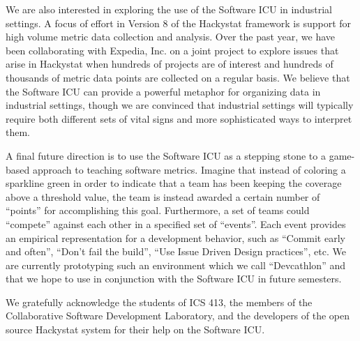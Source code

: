 \documentclass[times,10pt,twocolumn]{article}
\begin{document}
We are also interested in exploring the use of the Software ICU in
industrial settings.  A focus of effort in Version 8 of the Hackystat
framework is support for high volume metric data collection and
analysis.  Over the past year, we have been collaborating with Expedia,
Inc. on a joint project to explore issues that arise in Hackystat when
hundreds of projects are of interest and hundreds of thousands of metric
data points are collected on a regular basis.  We believe that the Software
ICU can provide a powerful metaphor for organizing data in industrial
settings, though we are convinced that industrial settings will typically
require both different sets of vital signs and more sophisticated ways to
interpret them.

A final future direction is to use the Software ICU as a stepping stone to
a game-based approach to teaching software metrics.  Imagine that instead
of coloring a sparkline green in order to indicate that a team has been
keeping the coverage above a threshold value, the team is instead awarded
a certain number of ``points'' for accomplishing this goal.  Furthermore,
a set of teams could ``compete'' against each other in a specified set of
``events''.  Each event provides an empirical representation for a
development behavior, such as ``Commit early and often'', ``Don't fail the
build'', ``Use Issue Driven Design practices'', etc.  We are currently
prototyping such an environment which we call ``Devcathlon'' and that we
hope to use in conjunction with the Software ICU in future semesters.


We gratefully acknowledge the students of ICS 413, the members of the Collaborative Software Development Laboratory, and
the developers of the open source Hackystat system for their help on the Software ICU.


  
\end{document}
